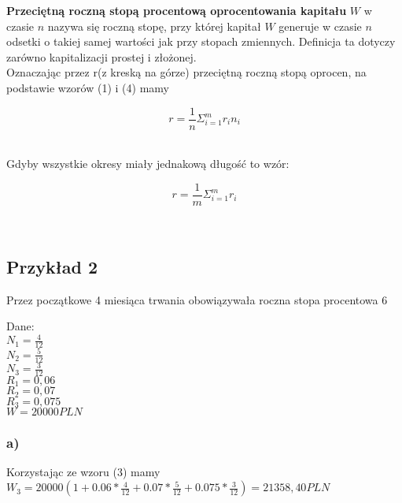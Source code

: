 \documentclass{article}
\begin{document}
\textbf{Przeciętną roczną stopą procentową oprocentowania kapitału} $ W $ w czasie $ n $ nazywa się roczną stopę, przy której kapitał $ W $ generuje w czasie $ n $ odsetki o takiej samej wartości jak przy stopach zmiennych. Definicja ta dotyczy zarówno kapitalizacji prostej i złożonej.\\

Oznaczając przez r(z kreską na górze) przeciętną roczną stopą oprocen, na podstawie wzorów (1) i (4) mamy

\begin{center}
	\begin{equation}
		r = \frac{1}{n}\Sigma^m_{i=1}r_in_i
	\end{equation}
\end{center}\\

Gdyby wszystkie okresy miały jednakową długość to wzór:

\begin{center}
	\begin{equation}
		r = \frac{1}{m}\Sigma^m_{i=1}r_i
	\end{equation}
\end{center}\\

\newpage

\subsection{Przykład 2}
Przez początkowe 4 miesiąca trwania obowiązywała roczna stopa procentowa 6%

Dane:\\

$ N_1 = \frac{4}{12} $\\

$ N_2 = \frac{5}{12} $\\

$ N_3 = \frac{3}{12} $\\

$ R_1 = 0,06 $\\

$ R_2 = 0,07 $\\

$ R_3 = 0,075 $\\

$ W = 20 000 PLN $

\subsubsection{a)}
Korzystając ze wzoru (3) mamy\\
$ W_3 = 20000(1 + 0.06*\frac{4}{12} + 0.07*\frac{5}{12} + 0.075*\frac{3}{12}) = 21 358,40 PLN $
\end{document}
